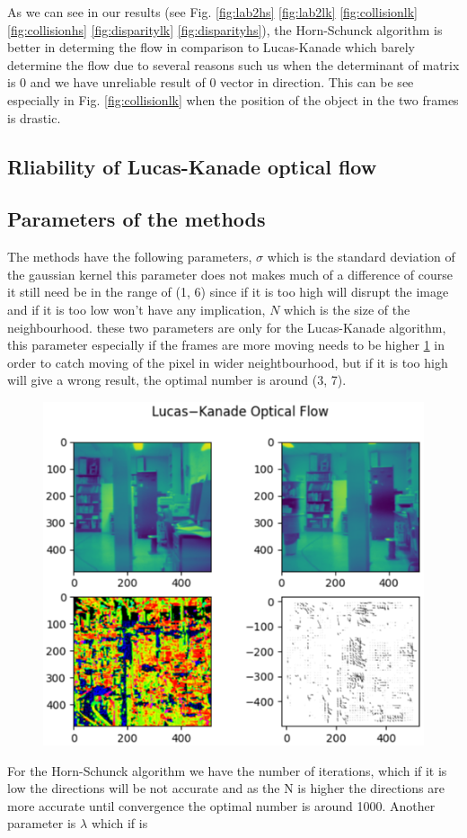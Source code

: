 \documentclass[9pt]{IEEEtran}
\begin{document}
As we can see in our results (see Fig. \ref{fig:lab2hs} \ref{fig:lab2lk} \ref{fig:collisionlk} \ref{fig:collisionhs} \ref{fig:disparitylk} \ref{fig:disparityhs}), the Horn-Schunck algorithm is better in determing the flow in comparison to Lucas-Kanade which barely determine the flow due to several reasons such us when the determinant of matrix is 0 and we have unreliable result of 0 vector in direction.
This can be see especially in Fig. \ref{fig:collisionlk} when the position of the object in the two frames is drastic.
\subsection{Rliability of Lucas-Kanade optical flow}
\subsection{Parameters of the methods}
The methods have the following parameters, $\sigma$ which is the standard deviation of the gaussian kernel this parameter does not makes much of a difference of course it still need be in the range of (1, 6) since if it is too high will disrupt the image and if it is too low won't have any implication, $N$ which is the size of the neighbourhood. these two parameters are only for the Lucas-Kanade algorithm, this parameter especially if the frames are more moving needs to be higher \ref{fig:lab2lk7} in order to catch moving of the pixel in wider neightbourhood, but if it is too high will give a wrong result, the optimal number is around (3, 7).
\begin{figure}[h]
    \centering
    \includegraphics[width=1\columnwidth, scale=0.5]{lab2lk7.eps}
    \label{fig:lab2lk7}
\end{figure}
For the Horn-Schunck algorithm we have the number of iterations, which if it is low the directions will be not accurate and as the N is higher the directions are more accurate until convergence the optimal number is around 1000.
Another parameter is $\lambda$ which if is 
\end{document}
